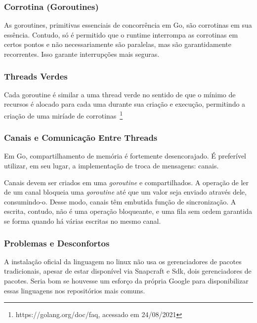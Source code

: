\documentclass{article}
\begin{document}
\subsubsection{Corrotina (Goroutines)}
\label{sssec:go corrotina}

As goroutines, primitivas essenciais de concorrência em Go, são corrotinas em sua essência. Contudo, só é permitido que o runtime interrompa as corrotinas em certos pontos e não necessariamente são paralelas, mas são garantidamente recorrentes. Isso garante interrupções mais seguras.

\subsubsection{Threads Verdes}
\label{sssec:go threads verdes}

Cada goroutine é similar a uma thread verde no sentido de que o mínimo de recursos é alocado para cada uma durante sua criação e execução, permitindo a criação de uma miríade de corrotinas~\footnote{https://golang.org/doc/faq, acessado em 24/08/2021}

\subsubsection{Canais e Comunicação Entre Threads}
\label{sssec:go canais}

Em Go, compartilhamento de memória é fortemente desencorajado. É preferível utilizar, em seu lugar, a implementação de troca de mensagens: canais.

Canais devem ser criados em uma \emph{goroutine} e compartilhados. A operação de ler de um canal bloqueia uma \emph{goroutine} até que um valor seja enviado através dele, consumindo-o. Desse modo, canais têm embutida função de sincronização. A escrita, contudo, não é uma operação bloqueante, e uma fila sem ordem garantida se forma quando há várias escritas no mesmo canal.

\subsubsection{Problemas e Desconfortos}
\label{sssec:go problemas}

A instalação oficial da linguagem no linux não usa os gerenciadores de pacotes tradicionais, apesar de estar disponível via Snapcraft e  Sdk, dois gerenciadores de pacotes. Seria bom se houvesse um esforço da própria Google para disponibilizar essas linguagens nos repositórios mais comuns.
\end{document}
